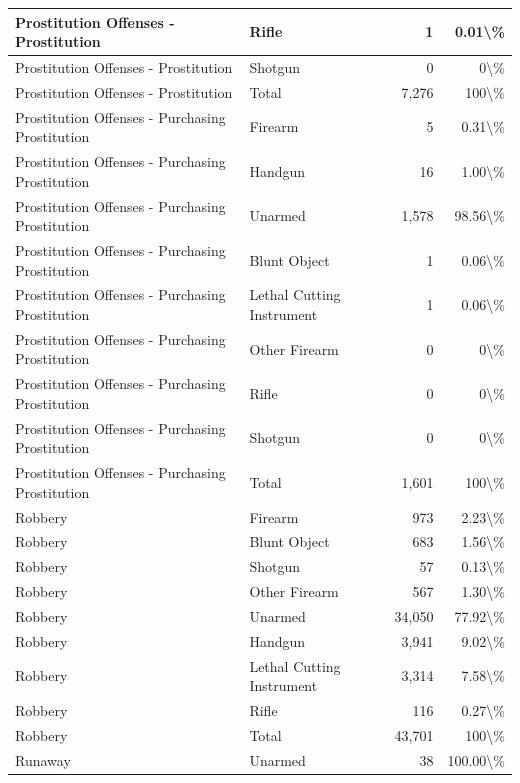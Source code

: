 \documentclass[
]{krantz}
\begin{document}
\begin{longtable}[t]{l|l|r|r}
\hline
Prostitution Offenses - Prostitution & Rifle & 1 & 0.01\textbackslash{}\%\\
\hline
Prostitution Offenses - Prostitution & Shotgun & 0 & 0\textbackslash{}\%\\
\hline
Prostitution Offenses - Prostitution & Total & 7,276 & 100\textbackslash{}\%\\
\hline
Prostitution Offenses - Purchasing Prostitution & Firearm & 5 & 0.31\textbackslash{}\%\\
\hline
Prostitution Offenses - Purchasing Prostitution & Handgun & 16 & 1.00\textbackslash{}\%\\
\hline
Prostitution Offenses - Purchasing Prostitution & Unarmed & 1,578 & 98.56\textbackslash{}\%\\
\hline
Prostitution Offenses - Purchasing Prostitution & Blunt Object & 1 & 0.06\textbackslash{}\%\\
\hline
Prostitution Offenses - Purchasing Prostitution & Lethal Cutting Instrument & 1 & 0.06\textbackslash{}\%\\
\hline
Prostitution Offenses - Purchasing Prostitution & Other Firearm & 0 & 0\textbackslash{}\%\\
\hline
Prostitution Offenses - Purchasing Prostitution & Rifle & 0 & 0\textbackslash{}\%\\
\hline
Prostitution Offenses - Purchasing Prostitution & Shotgun & 0 & 0\textbackslash{}\%\\
\hline
Prostitution Offenses - Purchasing Prostitution & Total & 1,601 & 100\textbackslash{}\%\\
\hline
Robbery & Firearm & 973 & 2.23\textbackslash{}\%\\
\hline
Robbery & Blunt Object & 683 & 1.56\textbackslash{}\%\\
\hline
Robbery & Shotgun & 57 & 0.13\textbackslash{}\%\\
\hline
Robbery & Other Firearm & 567 & 1.30\textbackslash{}\%\\
\hline
Robbery & Unarmed & 34,050 & 77.92\textbackslash{}\%\\
\hline
Robbery & Handgun & 3,941 & 9.02\textbackslash{}\%\\
\hline
Robbery & Lethal Cutting Instrument & 3,314 & 7.58\textbackslash{}\%\\
\hline
Robbery & Rifle & 116 & 0.27\textbackslash{}\%\\
\hline
Robbery & Total & 43,701 & 100\textbackslash{}\%\\
\hline
Runaway & Unarmed & 38 & 100.00\textbackslash{}\%\\

\end{longtable}
\end{document}
